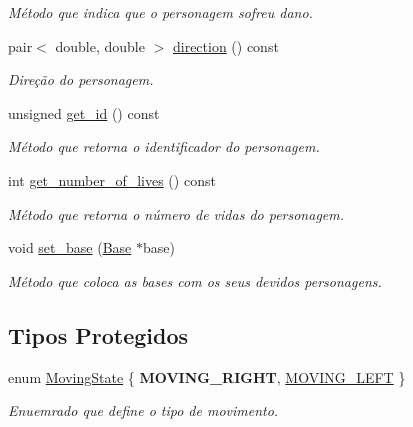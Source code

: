 \begin{DoxyCompactItemize}
\begin{DoxyCompactList}\small\item\em Método que indica que o personagem sofreu dano. \end{DoxyCompactList}\item 
\mbox{\label{classCharacter_a41e5ac6f8f3b9a15d78dd92de89768af}} 
pair$<$ double, double $>$ \mbox{\hyperlink{classCharacter_a41e5ac6f8f3b9a15d78dd92de89768af}{direction}} () const
\begin{DoxyCompactList}\small\item\em Direção do personagem. \end{DoxyCompactList}\item 
\mbox{\label{classCharacter_af5a0058d7cc922c1045f304b480a211c}} 
unsigned \mbox{\hyperlink{classCharacter_af5a0058d7cc922c1045f304b480a211c}{get\+\_\+id}} () const
\begin{DoxyCompactList}\small\item\em Método que retorna o identificador do personagem. \end{DoxyCompactList}\item 
\mbox{\label{classCharacter_ad3fc9bf9dc3667f9d01b05f5e1940ae6}} 
int \mbox{\hyperlink{classCharacter_ad3fc9bf9dc3667f9d01b05f5e1940ae6}{get\+\_\+number\+\_\+of\+\_\+lives}} () const
\begin{DoxyCompactList}\small\item\em Método que retorna o número de vidas do personagem. \end{DoxyCompactList}\item 
void \mbox{\hyperlink{classCharacter_a4cb413b53515a09d025fa0b3fe5a4e9f}{set\+\_\+base}} (\mbox{\hyperlink{classBase}{Base}} $\ast$base)
\begin{DoxyCompactList}\small\item\em Método que coloca as bases com os seus devidos personagens. \end{DoxyCompactList}\end{DoxyCompactItemize}
\subsection*{Tipos Protegidos}
\begin{DoxyCompactItemize}
\item 
enum \mbox{\hyperlink{classCharacter_afbe3b1ceb8e8463b3b66964080149c30}{Moving\+State}} \{ {\bfseries M\+O\+V\+I\+N\+G\+\_\+\+R\+I\+G\+HT}, 
\mbox{\hyperlink{classCharacter_afbe3b1ceb8e8463b3b66964080149c30a69693b1dd7704b911fcc556b58e7562d}{M\+O\+V\+I\+N\+G\+\_\+\+L\+E\+FT}}
 \}
\begin{DoxyCompactList}\small\item\em Enuemrado que define o tipo de movimento. \end{DoxyCompactList}\end{DoxyCompactItemize}

